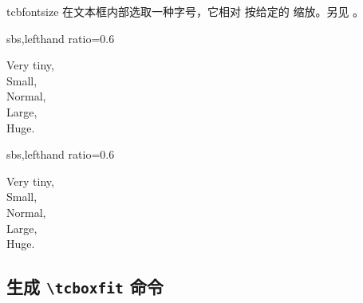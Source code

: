 \begin{docCommand}{tcbfontsize}{}
  在文本框内部选取一种字号，它相对  按给定的
   缩放。另见 。

\begin{dispExample*}{sbs,lefthand ratio=0.6}
\begin{tcolorbox}[fit basedim=10pt]
  { Very tiny,}\\
  { Small,}\\
  { Normal,}\\
  { Large,}\\
  { Huge.}
\end{tcolorbox}
\end{dispExample*}
\begin{dispExample*}{sbs,lefthand ratio=0.6}
\begin{tcolorbox}[fit basedim=10pt,
    fit to height=2cm]
  { Very tiny,}\\
  { Small,}\\
  { Normal,}\\
  { Large,}\\
  { Huge.}
\end{tcolorbox}
\end{dispExample*}
\end{docCommand}


\clearpage
\subsection{生成 \texttt{\textbackslash tcboxfit} 命令}\label{subsec:fitting_new}


